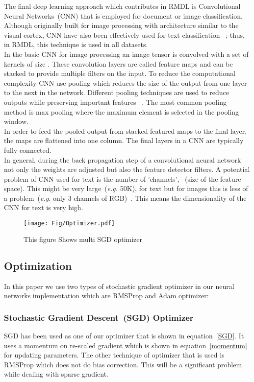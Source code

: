 \documentclass[sigconf, final]{acmart}
\begin{document}
The final deep learning approach which contributes in RMDL is  Convolutional Neural Networks~(CNN) that is employed for  document or image classification. Although originally built for image processing with architecture similar to the visual cortex, CNN have also been effectively used for  text classification ~\cite{lecun1998gradient}; thus, in RMDL, this technique is used in all datasets. \\ In the basic CNN for image processing an image tensor is convolved with a set of kernels of size . These convolution layers are called feature maps and can be stacked to provide multiple filters on the input. To reduce the computational complexity CNN use pooling which reduces the size of the output from one layer to the next in the network. Different pooling techniques are used to reduce outputs while preserving important features ~\cite{scherer2010evaluation}. The most common pooling method is max pooling where the maximum element is selected in the pooling window.\\ In order to feed the pooled output from stacked featured maps to the final layer, the maps are flattened into one column. The final layers in a CNN are typically fully connected.\\
In general, during the back propagation step of a convolutional neural network not only the weights are adjusted but also the feature detector filters. A potential problem of CNN used for text is the number of 'channels', ~(size of the feature space). This might be very large~(\textit{e.g.} 50K), for text but for images this is less of a problem~(\textit{e.g.} only 3 channels of RGB)~\cite{johnson2014effective}. This means the dimensionality of the CNN for text is very high.

\begin{figure}[t]
\centering

\texttt{[image: Fig/Optimizer.pdf]}
\caption{This figure Shows multi SGD optimizer }\label{Optimizer}
\vspace{-0.15in}
\end{figure}


\subsection{Optimization}\label{subsec:Optimization}
In this paper we use two types of stochastic gradient optimizer in our neural networks implementation which are RMSProp  and Adam optimizer:
\subsubsection{Stochastic Gradient Descent~(SGD) Optimizer}
SGD has been used as one of our optimizer that is shown in equation~\ref{SGD}. It uses a momentum on re-scaled gradient which is shown in equation~\ref{momentum} for updating parameters. The other technique of optimizer that is used is RMSProp which does not do bias correction. This will be a significant problem while dealing with sparse gradient. 
\end{document}
